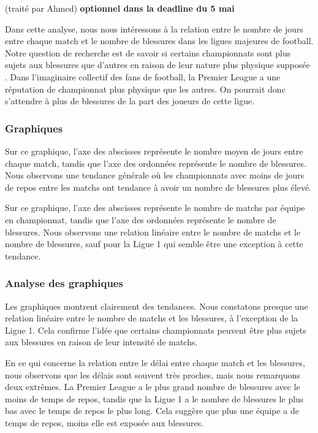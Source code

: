 \documentclass[
]{article}
\begin{document}
(traité par Ahmed) \textbf{optionnel dans la deadline du 5 mai}

Dans cette analyse, nous nous intéressons à la relation entre le nombre
de jours entre chaque match et le nombre de blessures dans les ligues
majeures de football. Notre question de recherche est de savoir si
certains championnats sont plus sujets aux blessures que d'autres en
raison de leur nature plus physique supposée . Dans l'imaginaire
collectif des fans de football, la Premier League a une réputation de
championnat plus physique que les autres. On pourrait donc s'attendre à
plus de blessures de la part des joueurs de cette ligue.

\hypertarget{graphiques}{%
\subsubsection{Graphiques}\label{graphiques}}

Sur ce graphique, l'axe des abscisses représente le nombre moyen de
jours entre chaque match, tandis que l'axe des ordonnées représente le
nombre de blessures. Nous observons une tendance générale où les
championnats avec moins de jours de repos entre les matchs ont tendance
à avoir un nombre de blessures plus élevé.

Sur ce graphique, l'axe des abscisses représente le nombre de matchs par
équipe en championnat, tandis que l'axe des ordonnées représente le
nombre de blessures. Nous observons une relation linéaire entre le
nombre de matchs et le nombre de blessures, sauf pour la Ligue 1 qui
semble être une exception à cette tendance.

\hypertarget{analyse-des-graphiques-1}{%
\subsubsection{Analyse des graphiques}\label{analyse-des-graphiques-1}}

Les graphiques montrent clairement des tendances. Nous constatons
presque une relation linéaire entre le nombre de matchs et les
blessures, à l'exception de la Ligue 1. Cela confirme l'idée que
certains championnats peuvent être plus sujets aux blessures en raison
de leur intensité de matchs.

En ce qui concerne la relation entre le délai entre chaque match et les
blessures, nous observons que les délais sont souvent très proches, mais
nous remarquons deux extrêmes. La Premier League a le plus grand nombre
de blessures avec le moins de temps de repos, tandis que la Ligue 1 a le
nombre de blessures le plus bas avec le temps de repos le plus long.
Cela suggère que plus une équipe a de temps de repos, moins elle est
exposée aux blessures.
\end{document}
